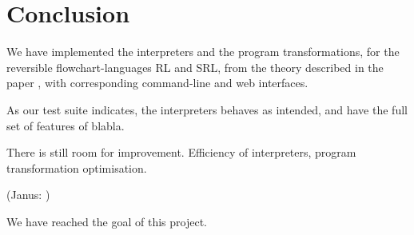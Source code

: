 \chapter{Conclusion}

We have implemented the interpreters and the program transformations, for the reversible flowchart-languages RL and SRL, from the theory described in the paper \cite{rev}, with corresponding command-line and web interfaces.

As our test suite indicates, the interpreters behaves as intended, and have the full set of features of blabla.

There is still room for improvement. Efficiency of interpreters, program transformation optimisation.

(Janus: \cite{JAN})

We have reached the goal of this project.
